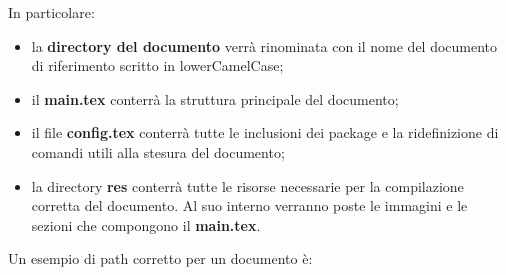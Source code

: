 \vspace{1cm}
\noindent In particolare: 
\begin{itemize}
	\item la \textbf{directory del documento} verrà rinominata con il nome del documento di riferimento scritto in lowerCamelCase;
	\item il \textbf{main.tex} conterrà la struttura principale del documento;
	\item il file \textbf{config.tex} conterrà tutte le inclusioni dei package e la ridefinizione di comandi utili alla stesura del documento;
	\item la directory \textbf{res} conterrà tutte le risorse necessarie per la compilazione corretta del documento. Al suo interno verranno poste le immagini e le sezioni che compongono il \textbf{main.tex}.
\end{itemize}
Un esempio di path corretto per un documento è:\\ 

\centerline{}